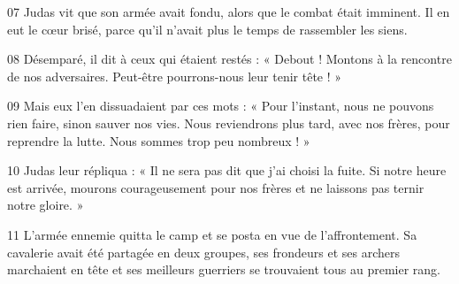 
07 Judas vit que son armée avait fondu, alors que le combat était imminent. Il en eut le cœur brisé, parce qu’il n’avait plus le temps de rassembler les siens.

08 Désemparé, il dit à ceux qui étaient restés : « Debout ! Montons à la rencontre de nos adversaires. Peut-être pourrons-nous leur tenir tête ! »

09 Mais eux l’en dissuadaient par ces mots : « Pour l’instant, nous ne pouvons rien faire, sinon sauver nos vies. Nous reviendrons plus tard, avec nos frères, pour reprendre la lutte. Nous sommes trop peu nombreux ! »

10 Judas leur répliqua : « Il ne sera pas dit que j’ai choisi la fuite. Si notre heure est arrivée, mourons courageusement pour nos frères et ne laissons pas ternir notre gloire. »

11 L’armée ennemie quitta le camp et se posta en vue de l’affrontement. Sa cavalerie avait été partagée en deux groupes, ses frondeurs et ses archers marchaient en tête et ses meilleurs guerriers se trouvaient tous au premier rang.
